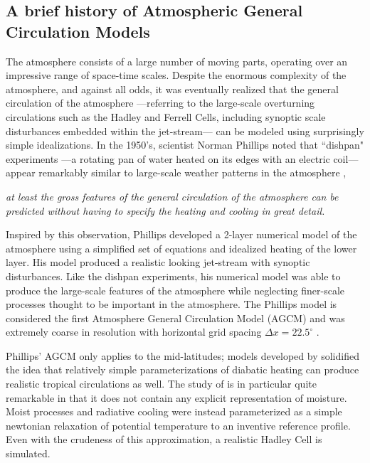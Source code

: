 \subsection{A brief history of Atmospheric General Circulation Models}

The atmosphere consists of a large number of moving parts, operating over an impressive range of space-time scales. Despite the enormous complexity of the atmosphere, and against all odds, it was eventually realized that the general circulation of the atmosphere ---referring to the large-scale overturning circulations such as the Hadley and Ferrell Cells, including synoptic scale disturbances embedded within the jet-stream--- can be modeled using surprisingly simple idealizations. In the 1950's, scientist Norman Phillips noted that  ``dishpan" experiments ---a rotating pan of water heated on its edges with an electric coil--- appear remarkably similar to large-scale weather patterns in the atmosphere \citep{WEART2008},
\begin{displayquote}
{\em{at least the gross features of the general circulation of the atmosphere can be predicted without having to specify the heating and cooling in great detail.}}
\end{displayquote}
Inspired by this observation, Phillips developed a 2-layer numerical model of the atmosphere using a simplified set of equations and idealized heating of the lower layer. His model produced a realistic looking jet-stream with synoptic disturbances. Like the dishpan experiments, his numerical model was able to produce the large-scale features of the atmosphere while neglecting finer-scale processes thought to be important in the atmosphere. The Phillips model is considered the first Atmosphere General Circulation Model (AGCM) and was extremely coarse in resolution with horizontal grid spacing $\Delta x = 22.5^{\circ}$ \citep{WEART2008}.

Phillips' AGCM only applies to the mid-latitudes; models developed by \cite{METAL1965MWR, HH1980JAS} solidified the idea that relatively simple parameterizations of diabatic heating can produce realistic tropical circulations as well. The study of \cite{HH1980JAS} is in particular quite remarkable in that it does not contain any explicit representation of moisture. Moist processes and radiative cooling were instead parameterized as a simple newtonian relaxation of potential temperature to an inventive reference profile. Even with the crudeness of this approximation, a realistic Hadley Cell is simulated. 

